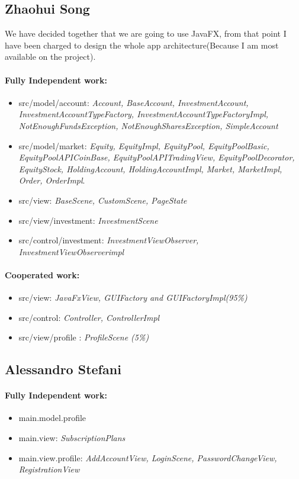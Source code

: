 \documentclass[a4paper,12pt]{report}
\begin{document}
\subsection{Zhaohui Song}
We have decided together that we are going to use JavaFX, from that point I have been charged to design the whole app architecture(Because I am most available on the project).
\paragraph*{Fully Independent work:}
\begin{itemize}
    \item src/model/account: \textit{Account, BaseAccount, InvestmentAccount, 
    InvestmentAccountTypeFactory, InvestmentAccountTypeFactoryImpl, NotEnoughFundsException, NotEnoughSharesException, SimpleAccount}
    \item src/model/market: \textit{Equity, EquityImpl, EquityPool, EquityPoolBasic, 
    EquityPoolAPICoinBase, EquityPoolAPITradingView, EquityPoolDecorator, 
    EquityStock, HoldingAccount, HoldingAccountImpl, Market, MarketImpl, Order, OrderImpl}.
    \item src/view: \textit{BaseScene, CustomScene, PageState}
    \item src/view/investment: \textit{InvestmentScene}
    \item src/control/investment: \textit{InvestmentViewObserver, InvestmentViewObserverimpl}
\end{itemize}

\paragraph*{Cooperated work:}
\begin{itemize}
     \item src/view: \textit{JavaFxView, GUIFactory and GUIFactoryImpl(95\%)}
     \item src/control: \textit{Controller, ControllerImpl}
     \item src/view/profile : \textit{ProfileScene (5\%)}
\end{itemize}

\subsection{Alessandro Stefani}
\paragraph*{Fully Independent work:}
\begin{itemize}
    \item main.model.profile
    \item main.view: \textit{SubscriptionPlans}
    \item main.view.profile: \textit{AddAccountView, LoginScene, PasswordChangeView, RegistrationView}
\end{itemize}
\end{document}

